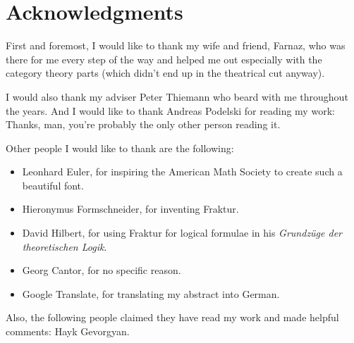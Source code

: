 \chapter{Acknowledgments}

First and foremost, I would like to thank my wife and friend, Farnaz, who was there for me every step of the way and helped me out especially with the category theory parts (which didn't end up in the theatrical cut anyway).

I would also thank my adviser Peter Thiemann who beard with me throughout the years. And I would like to thank Andreas Podelski for reading my work: Thanks, man, you're probably the only other person reading it.

Other people I would like to thank are the following:
\begin{itemize}
    \item Leonhard Euler, for inspiring the American Math Society to create such a beautiful font.
    \item Hieronymus Formschneider, for inventing Fraktur.
    \item David Hilbert, for using Fraktur for logical formulae in his \textit{Grundzüge der theoretischen Logik}.
    \item Georg Cantor, for no specific reason.
    \item Google Translate, for translating my abstract into German.
\end{itemize}

Also, the following people claimed they have read my work and made helpful comments: Hayk Gevorgyan.